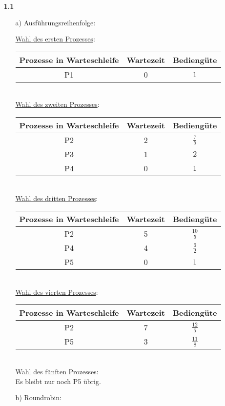 \documentclass[a4paper,11pt]{article}
\author{\authorinfo}
\title{\titleinfo}
\date{\today}
\begin{document}
\maketitle


\begin{enumerate}
\item[\textbf{1.1}]

\begin{itemize}
    \item[a)] Ausführungsreihenfolge:
    \begin{figure}[h]
        \scalebox{0.5}{}
    \end{figure}


    \underline{Wahl des ersten Prozesses}:\\
    \begin{tabular}{c|c|c}
        Prozesse in Warteschleife & Wartezeit & Bediengüte \\
        \hline
        P1 & 0 & $1$\\
    \end{tabular} \\
    \underline{Wahl des zweiten Prozesses}:\\
    \begin{tabular}{c|c|c}
        Prozesse in Warteschleife & Wartezeit & Bediengüte \\
        \hline
        P2 & 2 & $\frac{7}{5}$ \\
        P3 & 1 & $2$ \\
        P4 & 0 & $1$ \\
    \end{tabular} \\
    \underline{Wahl des dritten Prozesses}:\\
    \begin{tabular}{c|c|c}
        Prozesse in Warteschleife & Wartezeit & Bediengüte \\
        \hline
        P2 & 5 & $\frac{10}{5}$ \\
        P4 & 4 & $\frac{6}{2}$ \\
        P5 & 0 & $1$\\
    \end{tabular} \\
    \underline{Wahl des vierten Prozesses}:\\
    \begin{tabular}{c|c|c}
        Prozesse in Warteschleife & Wartezeit & Bediengüte \\
        \hline
        P2 & 7 & $\frac{12}{5}$ \\
        P5 & 3 & $\frac{11}{8}$ \\
    \end{tabular} \\
    \underline{Wahl des fünften Prozesses}:\\
    Es bleibt nur noch P5 übrig.
    \item[b)] Roundrobin:
    \begin{figure}[h]
        \scalebox{0.5}{}
    \end{figure}


\end{itemize}
\end{enumerate}
\end{document}

